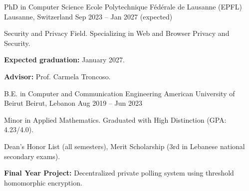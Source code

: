 

\begin{cventries}

  \cventry
    {PhD in Computer Science} %
    {Ecole Polytechnique Fédérale de Lausanne (EPFL)} %
    {Lausanne, Switzerland} %
    {Sep 2023 -- Jan 2027 (expected)} %
    {
      \begin{cvitems} %
        \item {Security and Privacy Field. Specializing in Web and Browser Privacy and Security.}
        \item {\textbf{Expected graduation:} January 2027.}
        \item {\textbf{Advisor:} Prof. Carmela Troncoso.}
      \end{cvitems}
    }

  \cventry
    {B.E. in Computer and Communication Engineering} %
    {American University of Beirut} %
    {Beirut, Lebanon} %
    {Aug 2019 -- Jun 2023} %
    {
      \begin{cvitems} %
        \item {Minor in Applied Mathematics. Graduated with High Distinction (GPA: 4.23/4.0).}
        \item {Dean's Honor List (all semesters), Merit Scholarship (3rd in Lebanese national secondary exams).}
        \item {\textbf{Final Year Project:} Decentralized private polling system using threshold homomorphic encryption.}
      \end{cvitems}
    }
\end{cventries}

